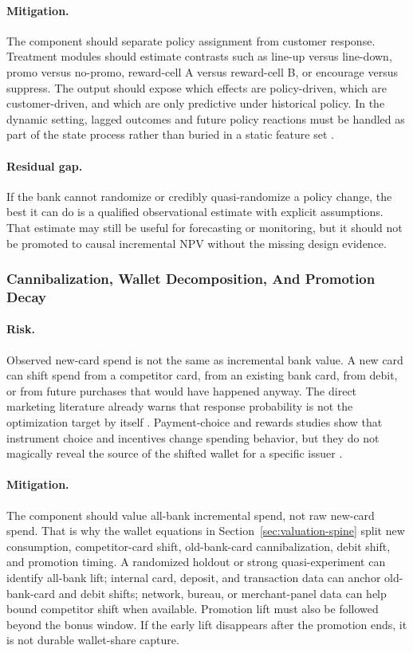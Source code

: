 \documentclass[11pt]{article}
\newcommand{\1}{\mathbf{1}}
\begin{document}
\paragraph{Mitigation.}
The component should separate policy assignment from customer response.
Treatment modules should estimate contrasts such as line-up versus line-down,
promo versus no-promo, reward-cell A versus reward-cell B, or encourage
versus suppress. The output should expose which effects are policy-driven,
which are customer-driven, and which are only predictive under historical
policy. In the dynamic setting, lagged outcomes and future policy reactions
must be handled as part of the state process rather than buried in a static
feature set \citep{arellano1991panel,blundell1998initial,rust1987replacement}.

\paragraph{Residual gap.}
If the bank cannot randomize or credibly quasi-randomize a policy change, the
best it can do is a qualified observational estimate with explicit assumptions.
That estimate may still be useful for forecasting or monitoring, but it should
not be promoted to causal incremental NPV without the missing design evidence.

\subsubsection{Cannibalization, Wallet Decomposition, And Promotion Decay}

\paragraph{Risk.}
Observed new-card spend is not the same as incremental bank value. A new card
can shift spend from a competitor card, from an existing bank card, from
debit, or from future purchases that would have happened anyway. The direct
marketing literature already warns that response probability is not the
optimization target by itself \citep{bult1995directmail}. Payment-choice and
rewards studies show that instrument choice and incentives change spending
behavior, but they do not magically reveal the source of the shifted wallet
for a specific issuer \citep{koulayev2012payment,agarwal2010rewards,
prelec2001creditcard,gross2001liquidity}.

\paragraph{Mitigation.}
The component should value all-bank incremental spend, not raw new-card spend.
That is why the wallet equations in Section~\ref{sec:valuation-spine} split
new consumption, competitor-card shift, old-bank-card cannibalization, debit
shift, and promotion timing. A randomized holdout or strong quasi-experiment
can identify all-bank lift; internal card, deposit, and transaction data can
anchor old-bank-card and debit shifts; network, bureau, or merchant-panel data
can help bound competitor shift when available. Promotion lift must also be
followed beyond the bonus window. If the early lift disappears after the
promotion ends, it is not durable wallet-share capture.
\end{document}
